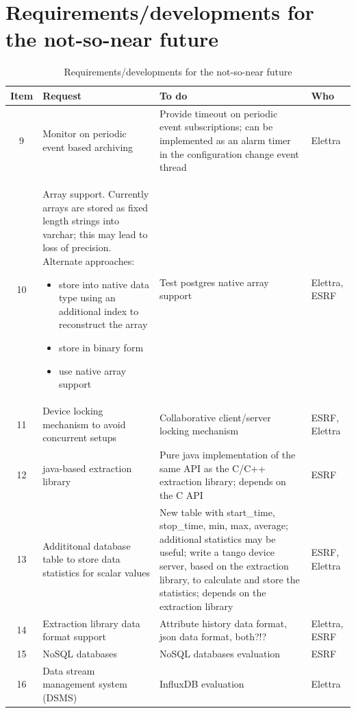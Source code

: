 \documentclass[11pt,a4paper]{article}
\begin{document}
\section{Requirements/developments for the not-so-near future}

\begin{table}[htb]
	\center
	\begin{tabular}{|c|p{6.1cm}|p{6.1cm}|p{1.1cm}|}
		\hline
		\bf{Item} & \bf{Request} & \bf{To do} & \bf{Who} \\
		\hline
		9 &
		Monitor on periodic event based archiving &
		Provide timeout on periodic event subscriptions; can be
		implemented as an alarm timer in the configuration change
		event thread &
		Elettra \\
		\hline
		10 &
		Array support. Currently arrays are stored as fixed length
		strings into varchar; this may lead to loss of precision.
		Alternate approaches:
		\begin{itemize}
			\item store into native data type using an additional index to
		    		reconstruct the array
			\item store in binary form
			\item use native array support
		\end{itemize} &
		Test postgres native array support &
		Elettra, ESRF \\
		\hline
		11 &
		Device locking mechanism to avoid concurrent setups &
		Collaborative client/server locking mechanism &
		ESRF, Elettra \\
		\hline
		12 &
		java-based extraction library &
		Pure java implementation of the same API as the C/C++ extraction
		library; depends on the C API &
		ESRF \\
		\hline
		13 &
		Addititonal database table to store data statistics for scalar
		values &
		New table with start\_time, stop\_time, min, max, average;
		additional statistics may be useful; write a tango device server,
		based on the extraction library, to calculate and store the
		statistics; depends on the extraction library &
		ESRF, Elettra \\
		\hline
		14 &
		Extraction library data format support &
		Attribute history data format, json data format, both?!? &
		Elettra, ESRF \\
		\hline
		15 &
		NoSQL databases &
		NoSQL databases evaluation &
		ESRF \\
		\hline
		16 &
		Data stream management system (DSMS) &
		InfluxDB evaluation &
		Elettra \\
		\hline
	\end{tabular}
	\caption{Requirements/developments for the not-so-near future}
	\label{tab:next-but-future}
\end{table}
\end{document}
